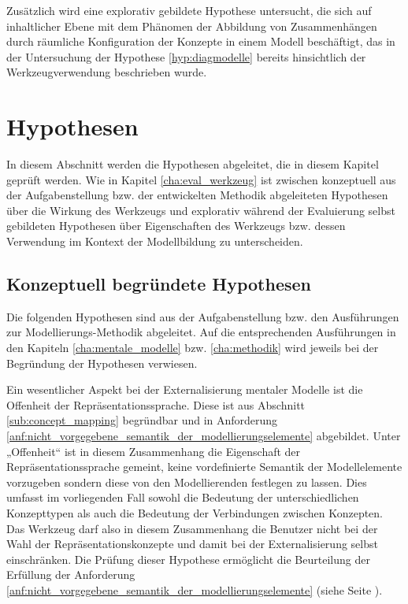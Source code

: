 Zusätzlich wird eine explorativ gebildete Hypothese untersucht, die sich auf inhaltlicher Ebene mit dem Phänomen der Abbildung von Zusammenhängen durch räumliche Konfiguration der Konzepte in einem Modell beschäftigt, das in der Untersuchung der Hypothese \ref{hyp:diagmodelle} bereits hinsichtlich der Werkzeugverwendung beschrieben wurde.

\section{Hypothesen} %
\label{sec:m_hypothesen}

In diesem Abschnitt werden die Hypothesen abgeleitet, die in diesem Kapitel geprüft werden. Wie in Kapitel \ref{cha:eval_werkzeug} ist zwischen konzeptuell aus der Aufgabenstellung bzw. der entwickelten Methodik abgeleiteten Hypothesen über die Wirkung des Werkzeugs und explorativ während der Evaluierung selbst gebildeten Hypothesen über Eigenschaften des Werkzeugs bzw. dessen Verwendung im Kontext der Modellbildung zu unterscheiden.

\subsection{Konzeptuell begründete Hypothesen} %
\label{sub:m_konzeptionell_begründete_hypothesen}

Die folgenden Hypothesen sind aus der Aufgabenstellung bzw. den Ausführungen zur Modellierungs-Methodik abgeleitet. Auf die entsprechenden Ausführungen in den Kapiteln \ref{cha:mentale_modelle} bzw. \ref{cha:methodik} wird jeweils bei der Begründung der Hypothesen verwiesen.

Ein wesentlicher Aspekt bei der Externalisierung mentaler Modelle ist die Offenheit der Repräsentationssprache. Diese ist aus Abschnitt \ref{sub:concept_mapping} begründbar und in Anforderung \ref{anf:nicht_vorgegebene_semantik_der_modellierungselemente} abgebildet. Unter „Offenheit“ ist in diesem Zusammenhang die Eigenschaft der Repräsentationssprache gemeint, keine vordefinierte Semantik der Modellelemente vorzugeben sondern diese von den Modellierenden festlegen zu lassen. Dies umfasst im vorliegenden Fall sowohl die Bedeutung der unterschiedlichen Konzepttypen als auch die Bedeutung der Verbindungen zwischen Konzepten. Das Werkzeug darf also in diesem Zusammenhang die Benutzer nicht bei der Wahl der Repräsentationskonzepte und damit bei der Externalisierung selbst einschränken. Die Prüfung dieser Hypothese ermöglicht die Beurteilung der Erfüllung der Anforderung \ref{anf:nicht_vorgegebene_semantik_der_modellierungselemente} (siehe Seite \pageref{anf:nicht_vorgegebene_semantik_der_modellierungselemente}).

